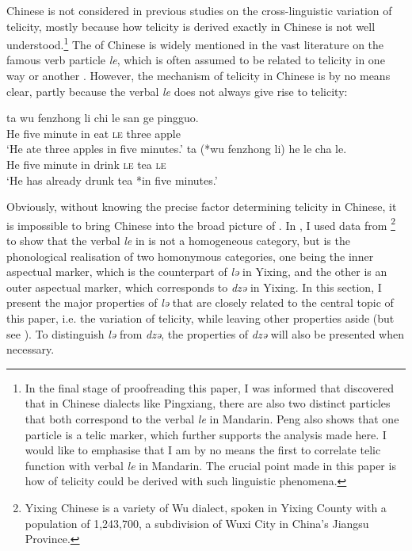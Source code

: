 \documentclass[output=paper]{langsci/langscibook}
\begin{document}
Chinese is not considered in previous studies on the cross-linguistic
variation of telicity, mostly because how telicity is derived exactly in
Chinese is not well understood.\footnote{In the final stage of proofreading
    this paper, I was informed that \textcite{Peng2017} discovered that in
    Chinese dialects like Pingxiang, there are also two distinct particles that
    both correspond to the verbal \emph{le} in Mandarin. Peng also shows that
    one particle is a telic marker, which further supports the analysis made
    here. I would like to emphasise that I am by no means the first to
    correlate telic function with verbal \emph{le} in Mandarin. The crucial
    point made in this paper is how  of telicity could be derived
with such linguistic phenomena.} The  of Chinese is widely
mentioned in the vast literature on the famous verb particle \emph{le}, which
is often assumed to be related to telicity in one way or another
\citep[cf.][]{smith1997parameter,lin2003aspectual,soh2007over,soh2009speaker,soh2014aspect}.
However, the mechanism of telicity in Chinese is by no means clear, partly
because the verbal \emph{le} does not always give rise to telicity:

\begin{exe}
\ex {} \begin{xlist}
	\ex\label{Yixing1} \gll ta wu fenzhong li chi le san ge pingguo. \\
	                        He five minute in eat \textsc{le} three \Clf{} apple \\
	                   \glt \enquote*{He ate three apples in five minutes.}
    \ex\label{Yixing2} \gll  ta (*wu fenzhong li) he le cha le. \\
                            He \hphantom{(*}five minute in drink \textsc{le} tea \textsc{le} \\
                       \glt \enquote*{He has already drunk tea *in five minutes.}
\end{xlist}
\end{exe}

Obviously, without knowing the precise factor determining telicity in Chinese,
it is impossible to bring Chinese into the broad picture of .  In \textcite{Huxuhui2016}, I used data from \footnote{Yixing Chinese is a variety of Wu dialect, spoken
in Yixing County with a population of 1,243,700, a subdivision of Wuxi City in
China’s Jiangsu Province.} to show that the verbal \emph{le} in  is not
a homogeneous category, but is the phonological realisation of two homonymous
categories, one being the inner aspectual marker, which is the counterpart of
\emph{lə} in Yixing, and the other is an outer aspectual marker, which
corresponds to \emph{dzə} in Yixing.  In this section, I present the major
properties of \emph{lə} that are closely related to the central topic of this
paper, i.e. the variation of telicity, while leaving other properties aside
(but see \textcite{Huxuhui2016}). To distinguish \emph{lə} from \emph{dzə}, the
properties of \emph{dzə} will also be presented when necessary.
\end{document}
